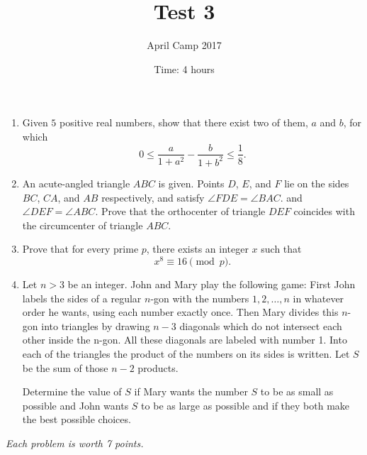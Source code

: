 \documentclass[a4paper,12pt]{article}
\title{Test 3}
\date{Time: 4 hours}
\author{April Camp 2017}
\begin{document}
 \maketitle

\begin{enumerate}
	\item %
	Given $5$ positive real numbers, show that there exist two of them,
	$a$ and $b$, for which
	\[
		0 \leq \frac{a}{1+a^2} - \frac{b}{1+b^2} \leq \frac{1}{8}.
	\]

	\item %
	An acute-angled triangle $ABC$ is given. Points $D$, $E$, and $F$ lie
	on the sides $BC$, $CA$, and $AB$ respectively, and satisfy $\angle
	FDE = \angle BAC$. and $\angle DEF = \angle ABC$. Prove that the
	orthocenter of triangle $DEF$ coincides with the circumcenter of
	triangle $ABC$.

	\item 
	Prove that for every prime $p$, there exists an integer $x$ such that \[x^8 \equiv 16 \pmod p.\]

	\item %
	Let $n > 3$ be an integer. John and Mary play the following game: First John labels the sides of a regular $n$-gon with the numbers $1, 2, \dotsc, n$ in whatever order he wants, using each number exactly once. Then Mary divides this $n$-gon into triangles by drawing $n − 3$ diagonals which do not intersect each other inside the n-gon. All these diagonals are labeled with number 1. Into each of the triangles the product of the numbers on its sides is written. Let $S$ be the sum of those $n − 2$ products.
	
Determine the value of $S$ if Mary wants the number $S$ to be as small as possible and John wants $S$ to be as large as possible and if they both make the best possible choices.

\end{enumerate}

\medskip 

\hfill \emph{Each problem is worth 7 points.}
	
\end{document}

